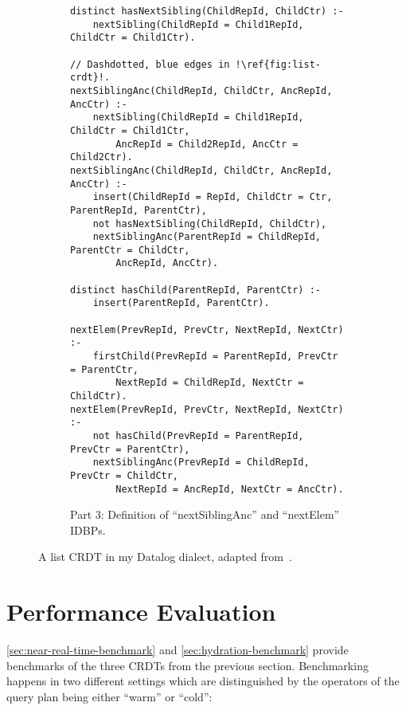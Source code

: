 \begin{figure}[htpb]\ContinuedFloat
	\centering

	\begin{subfigure}[b]{\textwidth}
		\begin{lstlisting}[keepspaces,escapechar=!]
distinct hasNextSibling(ChildRepId, ChildCtr) :-
    nextSibling(ChildRepId = Child1RepId, ChildCtr = Child1Ctr).

// Dashdotted, blue edges in !\ref{fig:list-crdt}!.
nextSiblingAnc(ChildRepId, ChildCtr, AncRepId, AncCtr) :-
    nextSibling(ChildRepId = Child1RepId, ChildCtr = Child1Ctr,
        AncRepId = Child2RepId, AncCtr = Child2Ctr).
nextSiblingAnc(ChildRepId, ChildCtr, AncRepId, AncCtr) :-
    insert(ChildRepId = RepId, ChildCtr = Ctr, ParentRepId, ParentCtr),
    not hasNextSibling(ChildRepId, ChildCtr),
    nextSiblingAnc(ParentRepId = ChildRepId, ParentCtr = ChildCtr,
        AncRepId, AncCtr).

distinct hasChild(ParentRepId, ParentCtr) :-
    insert(ParentRepId, ParentCtr).

nextElem(PrevRepId, PrevCtr, NextRepId, NextCtr) :-
    firstChild(PrevRepId = ParentRepId, PrevCtr = ParentCtr,
        NextRepId = ChildRepId, NextCtr = ChildCtr).
nextElem(PrevRepId, PrevCtr, NextRepId, NextCtr) :-
    not hasChild(PrevRepId = ParentRepId, PrevCtr = ParentCtr),
    nextSiblingAnc(PrevRepId = ChildRepId, PrevCtr = ChildCtr,
        NextRepId = AncRepId, NextCtr = AncCtr).\end{lstlisting}
		\caption{Part 3: Definition of ``nextSiblingAnc'' and ``nextElem'' \acp{IDBP}.}\label{code:list-crdt-datalog-dialect-part3}
	\end{subfigure}
	\caption{A list \ac{CRDT} in my Datalog dialect, adapted from~\cite{kleppmann2018data}.}\label{code:list-crdt-datalog-dialect}
\end{figure}

\section{Performance Evaluation}\label{sec:benchmarks}

\ref{sec:near-real-time-benchmark} and \ref{sec:hydration-benchmark}
provide benchmarks of the three \acp{CRDT} from the previous section.
Benchmarking happens in two different settings which are distinguished by
the operators of the query plan being either ``warm'' or ``cold'':

